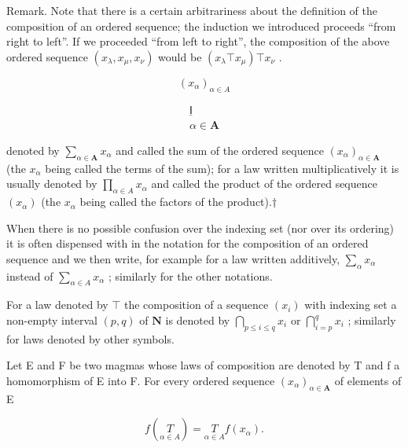 Remark. Note that there is a certain arbitrariness about the definition of the composition of an ordered sequence; the induction we introduced proceeds ``from right to left''. If we proceeded ``from left to right'', the composition of the above ordered sequence \((x_{\lambda}, x_{\mu}, x_{\nu})\) would be \((x_{\lambda} \top x_{\mu}) \top x_{\nu}\) .

\[
\left(x _ {\alpha}\right) _ {\alpha \in A}
\]

\[
\begin{array}{c} \underline {{\mathsf {I}}} \\ \alpha \in \mathbf {A} \end{array}
\]

denoted by \(\sum_{\alpha \in \mathbf{A}} x_{\alpha}\) and called the sum of the ordered sequence \((x_{\alpha})_{\alpha \in \mathbf{A}}\) (the \(x_{\alpha}\) being called the terms of the sum); for a law written multiplicatively it is usually denoted by \(\prod_{\alpha \in A} x_{\alpha}\) and called the product of the ordered sequence \((x_{\alpha})\) (the \(x_{\alpha}\) being called the factors of the product).†

When there is no possible confusion over the indexing set (nor over its ordering) it is often dispensed with in the notation for the composition of an ordered sequence and we then write, for example for a law written additively, \(\sum_{\alpha} x_{\alpha}\) instead of \(\sum_{\alpha \in A} x_{\alpha}\) ; similarly for the other notations.

For a law denoted by \(\top\) the composition of a sequence \((x_{i})\) with indexing set a non-empty interval \((p,q)\) of \(\mathbf{N}\) is denoted by \(\bigcap_{p\leqslant i\leqslant q}x_{i}\) or \(\bigcap_{i = p}^{q}x_{i}\) ; similarly for laws denoted by other symbols.

Let E and F be two magmas whose laws of composition are denoted by T and f a homomorphism of E into F. For every ordered sequence \((x_{\alpha})_{\alpha \in \mathbf{A}}\) of elements of E

\[
f \left(\underset {\alpha \in A} {T}\right) = \underset {\alpha \in A} {T} f (x _ {\alpha}).\tag{2}
\]

